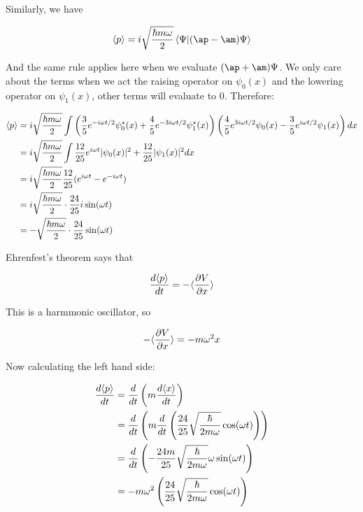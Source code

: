 \documentclass[10pt]{article}
\begin{document}
\begin{enumerate}[(a)]
\begin{solution}
            Similarly, we have 

            \[ \mean{p} = i \sqrt{\frac{\hbar m \omega}{2}} \braket{\Psi}{(\ap - \am) \Psi}\] 

            And the same rule applies here when we evaluate $(\ap + \am)\Psi$. We only care about the terms when we act the raising operator on $\psi_0(x)$ and the lowering operator on $\psi_1(x)$, other terms will evaluate to 0. Therefore: 

            \begin{align*}
                \langle p \rangle &= i \sqrt{\frac{\hbar m \omega}{2}} \int \left(\frac 35 e^{-i\omega t/2} \psi_0^\star(x) + \frac 45 e^{-3i\omega t/2}\psi_1^\star(x)\right)\left(\frac 45 e^{3i\omega t/2}\psi_0(x) - \frac 35 e^{i\omega t/2}\psi_1(x)\right) dx \\
                &= i \sqrt{\frac{\hbar m \omega}{2}} \int \frac{12}{25} e^{i\omega t} |\psi_0(x)|^2 + \frac{12}{25} |\psi_1(x)|^2 dx\\
                &= i \sqrt{\frac{\hbar m \omega}{2}} \frac{12}{25} (e^{i\omega t} - e^{-i\omega t})\\
                &=i \sqrt{\frac{\hbar m \omega}{2}} \cdot  \frac{24}{25} i \sin (\omega t)\\
                &= - \sqrt{\frac{\hbar m \omega}{2}} \cdot  \frac{24}{25}  \sin (\omega t)
            \end{align*}

            Ehrenfest's theorem says that 

            \[ \frac{d\langle p \rangle}{dt} = -\langle \frac{\partial V}{\partial x} \rangle\] 

            This is a harmmonic oscillator, so 

            \[ -\langle \frac{\partial V}{\partial x} \rangle = -m \omega^2 x\]

            Now calculating the left hand side: 

            \begin{align*}
                \frac{d\langle p \rangle}{dt} &= \frac{d}{dt} \left(m \frac{d\langle x \rangle}{dt}\right)\\
                &= \frac{d}{dt}\left(m \frac{d}{dt} \left(\frac{24}{25} \sqrt{\frac{\hbar}{2m\omega}} \cos (\omega t)\right)\right)\\
                &=  \frac{d}{dt}\left( -\frac{24m}{25} \sqrt{\frac{\hbar}{2m\omega}}\omega \sin (\omega t) \right)\\
                &= -m\omega^2 \left(\frac{24}{25} \sqrt{\frac{\hbar}{2m\omega}} \cos(\omega t)\right)
            \end{align*}


\end{solution}
\end{enumerate}
\end{document}
